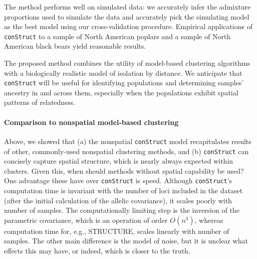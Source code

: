 \documentclass[12pt]{article}
\newcommand{\gb}[1]{{\it\color{magenta}{(#1)}}}
\begin{document}
The method performs well on simulated data:
we accurately infer the admixture proportions used to simulate the data 
and accurately pick the simulating model as the best model using our cross-validation procedure.
Empirical applications of \texttt{conStruct} to a sample of North American poplars 
and a sample of North American black bears yield reasonable results.

The proposed method combines the utility of model-based clustering algorithms 
with a biologically realistic model of isolation by distance.
We anticipate that \texttt{conStruct} will be useful for identifying populations 
and determining samples' ancestry in and across them, 
especially when the populations exhibit spatial patterns of relatedness.

\paragraph{Comparison to nonspatial model-based clustering}
Above, we showed that 
(a) the nonspatial \texttt{conStruct} model recapitulates results of 
other, commonly-used nonspatial clustering methods,
and 
(b) \texttt{conStruct} can concisely capture spatial structure, which is nearly always expected within clusters.
Given this, when should methods without spatial capability be used?
One advantage these have over \texttt{conStruct} is speed.
Although \texttt{conStruct}'s computation time is invariant 
with the number of loci included in the dataset 
(after the initial calculation of the allelic covariance), 
it scales poorly with number of samples.
The computationally limiting step is the inversion of the parametric covariance, 
which is an operation of order $O(n^3)$, 
whereas computation time for, e.g., STRUCTURE, 
scales linearly with number of samples. \gb{is this true?}
The other main difference is the model of noise,
but it is unclear what effects this may have,
or indeed, which is closer to the truth.
\end{document}
